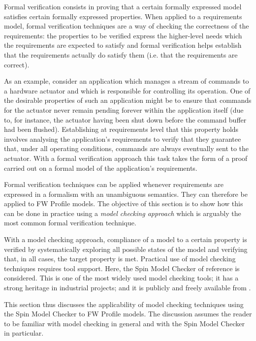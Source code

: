 \documentclass[definition]{../fwprofile}
\begin{document}
Formal verification consists in proving that a certain formally expressed model satisfies certain formally expressed properties. When applied to a requirements model, formal verification techniques are a way of checking the correctness of the requirements: the properties to be verified express the higher-level needs which the requirements are expected to satisfy and formal verification helps establish that the requirements actually do satisfy them (i.e. that the requirements are correct). 

As an example, consider an application which manages a stream of commands to a hardware actuator and which is responsible for controlling its operation. One of the desirable properties of such an application might be to ensure that commands for the actuator never remain pending forever within the application itself (due to, for instance, the actuator having been shut down before the command buffer had been flushed). Establishing at requirements level that this property holds involves analysing the application's requirements to verify that they guarantee that, under all operating conditions, commands are always eventually sent to the actuator. With a formal verification approach this task takes the form of a proof carried out on a formal model of the application's requirements.

Formal verification techniques can be applied whenever requirements are expressed in a formalism with an unambiguous semantics. They can therefore be applied to FW Profile models. The objective of this section is to show how this can be done in practice using a \textit{model checking approach} which is arguably the most common formal verification technique. 

With a model checking approach, compliance of a model to a certain property is verified by systematically exploring all possible states of the model and verifying that, in all cases, the target property is met. Practical use of model checking techniques requires tool support. Here, the Spin Model Checker of reference \cite{ref:spinBook} is considered. This is one of the most widely used model checking tools; it has a strong heritage in industrial projects; and it is publicly and freely available from \cite{ref:spinWebSite}. 

This section thus discusses the applicability of model checking techniques using the Spin Model Checker to FW Profile models. The discussion assumes the reader to be familiar with model checking in general and with the Spin Model Checker in particular.
\end{document}
